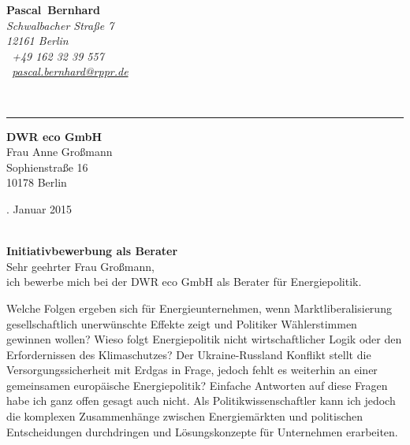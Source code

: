 \documentclass[11pt,a4paper]{article}
\def\firstname{Pascal}
\def\familyname{Bernhard}
\begin{document}
\sffamily   %
\hfill%
\begin{minipage}[t]{.6\textwidth}
	\raggedleft%
	{\bfseries {\color{firstnamecolor}\firstname}~{\color{familynamecolor}\familyname}}\\[.35ex]
	\small\itshape%
	Schwalbacher Straße 7\\
	12161 Berlin\\[.35ex]
	\Mobilefone~+49 162 32 39 557 \\
	\Letter~\href{mailto:pascal.bernhard@rppr.de}{pascal.bernhard@rppr.de}
\end{minipage}\\[0.5em]
%
{\color{firstnamecolor}\rule{\textwidth}{.25ex}}
%
\begin{minipage}[t]{.4\textwidth}
	\raggedright%
	\vspace*{1em}
	\textbf{DWR eco GmbH} \\
	Frau Anne Großmann \\[.35ex]
	\small%
	Sophienstraße 16\\
	10178 Berlin
\end{minipage}
%
\hfill
%
\begin{minipage}[t]{.4\textwidth}
	. Januar 2015

\end{minipage}\\[1em]


{\bfseries \color{familynamecolor}Initiativbewerbung als Berater}\\[0.75em]

Sehr geehrter Frau Großmann,\\[0.5em]
%
ich bewerbe mich bei der DWR eco GmbH als Berater für Energiepolitik.

Welche Folgen ergeben sich für Energieunternehmen, wenn Marktliberalisierung gesellschaftlich unerwünschte Effekte zeigt und Politiker Wählerstimmen gewinnen wollen? Wieso folgt Energiepolitik nicht wirtschaftlicher Logik oder den Erfordernissen des Klimaschutzes? Der Ukraine-Russland Konflikt stellt die Versorgungssicherheit mit Erdgas in Frage, jedoch fehlt es weiterhin an einer gemeinsamen europäische Energiepolitik? Einfache Antworten auf diese Fragen habe ich ganz offen gesagt auch nicht. Als Politikwissenschaftler kann ich jedoch die komplexen Zusammenhänge zwischen Energiemärkten und politischen Entscheidungen durchdringen und Lösungskonzepte für Unternehmen erarbeiten.
\end{document}
